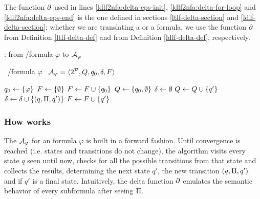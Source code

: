 The function $\partial$ used in lines \ref{ldlf2nfa:delta-eps-init}, \ref{ldlf2nfa:delta-for-loop} and \ref{ldlf2nfa:delta-eps-end} is the one defined in sections \ref{ltlf-delta-section} and \ref{ldlf-delta-section}; whether we are translating a \LTLf or a \LDLf formula, we use the function $\partial$ from Definition \ref{ltlf-delta-def} and from Definition \ref{ldlf-delta-def}, respectively.
\begin{algorithm}
	\caption{\LDLfToNFA: from \LTLf/\LDLf formula $\varphi$ to \NFA $\mathcal{A}_\varphi$}
	\label{alg:ldl2nfa}
	\begin{algorithmic}[1]
		\State \algInput\ \LDLf/\LTLf formula $\varphi$
		\State \algOutput\ \NFA $\mathcal{A}_\varphi = \langle 2^{\mathcal{P}}, Q, q_0, \delta, F \rangle$
		
		\State $q_0 \gets \{\varphi\}$
		\State $F \gets \{\emptyset\}$
		\If{$(\DfunEps{\varphi} = \true)$} \label{ldlf2nfa:delta-eps-init}
			\State $F \gets F \cup \{q_0\}$
		\EndIf
		\State $Q \gets \{q_0, \emptyset\}$
		\State $\delta \gets \emptyset$
			 \label{ldlf2nfa:main-for-loop}
				 \label{ldlf2nfa:delta-for-loop}
					\State $Q \gets Q \cup \{q'\}$
					\State $\delta \gets \delta \cup \{(q, \Pi, q')\}$
					 \label{ldlf2nfa:delta-eps-end}
						\State $F \gets F \cup \{q'\}$
					\EndIf
				\EndIf
				
			\EndFor
		
		\EndWhile
		
	
	\end{algorithmic}
	
\end{algorithm}

\subsubsection*{How \LDLfToNFA works}
The \NFA $\mathcal{A}_\varphi$ for an \LDLf formula $\varphi$ is built in a forward fashion. Until convergence is reached (i.e. states and transitions do not change), the algorithm visits every state $q$ seen until now, checks for all the possible transitions from that state and collects the results, determining the next state $q'$, the new transition $(q, \Pi, q')$ and if $q'$ is a final state. Intuitively, the delta function $\partial$ emulates the semantic behavior of every \LLf subformula after seeing $\Pi$.

